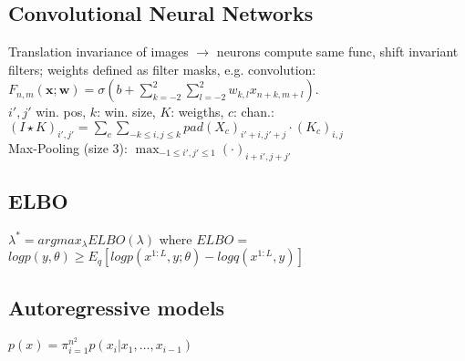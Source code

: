 \subsection*{Convolutional Neural Networks}
Translation invariance of images $\rightarrow$ neurons compute same func, shift invariant filters; weights defined as filter masks, e.g. convolution: $F_{n,m}(\mathbf{x};\mathbf{w}) = \sigma(b + \sum_{k=-2}^2\sum_{l=-2}^{2}{w_{k,l}x_{n+k,m+l}})$.\\
$i',j'$ win. pos, $k$: win. size, $K$: weigths, $c$: chan.:\\
 $(I\star K)_{i', j'} = \sum_c \sum_{-k\leq i,j \leq k} pad(X_c)_{i'+i,j'+j} \cdot(K_c)_{i,j}$\\
Max-Pooling (size 3): $\max_{-1\leq i', j' \leq 1}(\cdot)_{i+i', j+j'}$ %

\subsection*{ELBO}
$\lambda^* = argmax_\lambda ELBO(\lambda)$ where $ELBO=$\\
$log p(y,\theta) \geq E_q[log p(x^{1:L},y; \theta)-log q(x^{1:L}, y)]$

\subsection*{Autoregressive models}
$p(x)=\pi_{i=1}^{n^2} p(x_i|x_1,\dots ,x_{i-1})$
